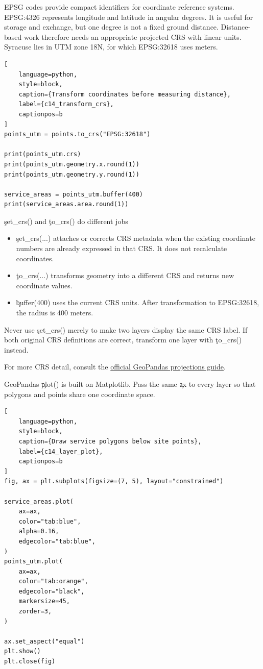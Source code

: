 
EPSG codes provide compact identifiers for coordinate reference systems.
EPSG:4326 represents longitude and latitude in angular degrees. It is useful
for storage and exchange, but one degree is not a fixed ground distance.
Distance-based work therefore needs an appropriate projected CRS with linear
units. Syracuse lies in UTM zone 18N, for which EPSG:32618 uses meters.

\begin{lstlisting}[
    language=python,
    style=block,
    caption={Transform coordinates before measuring distance},
    label={c14_transform_crs},
    captionpos=b
]
points_utm = points.to_crs("EPSG:32618")

print(points_utm.crs)
print(points_utm.geometry.x.round(1))
print(points_utm.geometry.y.round(1))

service_areas = points_utm.buffer(400)
print(service_areas.area.round(1))
\end{lstlisting}

\begin{SyntaxBox}{\c{set_crs()} and \c{to_crs()} do different jobs}
\begin{itemize}
    \item \c{set_crs(...)} attaches or corrects CRS metadata when the existing
          coordinate numbers are already expressed in that CRS. It does not
          recalculate coordinates.
    \item \c{to_crs(...)} transforms geometry into a different CRS and returns
          new coordinate values.
    \item \c{buffer(400)} uses the current CRS units. After transformation to
          EPSG:32618, the radius is 400 meters.
\end{itemize}
Never use \c{set_crs()} merely to make two layers display the same CRS label.
If both original CRS definitions are correct, transform one layer with
\c{to_crs()} instead.
\end{SyntaxBox}

For more CRS detail, consult the
\href{https://docs.geopandas.org/en/stable/docs/user_guide/projections.html}{official GeoPandas projections guide}.


GeoPandas \c{plot()} is built on Matplotlib. Pass the same \c{ax} to every layer
so that polygons and points share one coordinate space.

\begin{lstlisting}[
    language=python,
    style=block,
    caption={Draw service polygons below site points},
    label={c14_layer_plot},
    captionpos=b
]
fig, ax = plt.subplots(figsize=(7, 5), layout="constrained")

service_areas.plot(
    ax=ax,
    color="tab:blue",
    alpha=0.16,
    edgecolor="tab:blue",
)
points_utm.plot(
    ax=ax,
    color="tab:orange",
    edgecolor="black",
    markersize=45,
    zorder=3,
)

ax.set_aspect("equal")
plt.show()
plt.close(fig)
\end{lstlisting}

